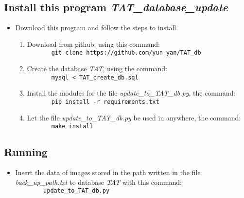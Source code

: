 \documentclass[12pt]{article}    %
\begin{document}
 \subsection{Install this program {\it TAT\_database\_update}}
 \begin{itemize}
  \item Download this program and follow the steps to install.
  \begin{enumerate}
   \item Download from github, using this command:\\
   \verb|		git clone https://github.com/yun-yan/TAT_db|
   \item Create the database {\it TAT}, using the command:\\
   \verb|		mysql < TAT_create_db.sql|	
   \item Install the modules for the file {\it update\_to\_TAT\_db.py}, the command:\\
   \verb|		pip install -r requirements.txt|
   \item Let the file {\it update\_to\_TAT\_db.py} be used in anywhere, the command:\\
   \verb|		make install|
 \end{enumerate}
 \end{itemize}	

 \subsection{Running}
 \begin{itemize}
  \item Insert the data of images stored in the path written in the file {\it back\_up\_path.txt} to database {\it TAT} with this command:\\
  \verb|		update_to_TAT_db.py|
 \end{itemize}
 	
\end{document}
